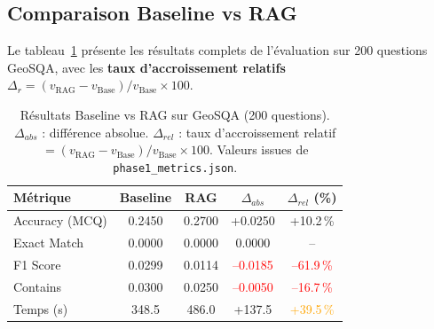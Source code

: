 \documentclass[12pt,a4paper]{article}
\begin{document}
\subsection{Comparaison Baseline vs RAG}
\label{sec:baseline_vs_rag}

Le tableau~\ref{tab:results_main} présente les résultats complets de l'évaluation
sur 200 questions GeoSQA, avec les \textbf{taux d'accroissement relatifs}
$\Delta_r = (v_{\text{RAG}} - v_{\text{Base}}) / v_{\text{Base}} \times 100$.

\begin{table}[H]
\centering
\caption{Résultats Baseline vs RAG sur GeoSQA (200 questions).
  $\Delta_{abs}$ : différence absolue.
  $\Delta_{rel}$ : taux d'accroissement relatif
  $= (v_{\text{RAG}} - v_{\text{Base}}) / v_{\text{Base}} \times 100$.
  Valeurs issues de \texttt{phase1\_metrics.json}.}
\label{tab:results_main}
\begin{tabular}{@{} l c c c c @{}}
\toprule
\textbf{Métrique} & \textbf{Baseline} & \textbf{RAG}
  & \textbf{$\Delta_{abs}$} & \textbf{$\Delta_{rel}$ (\%)} \\
\midrule
Accuracy (MCQ) & 0.2450 & 0.2700
  & \textcolor{green!60!black}{+0.0250}
  & \textcolor{green!60!black}{+10.2\,\%} \\
Exact Match    & 0.0000 & 0.0000
  & 0.0000 & -- \\
F1 Score       & 0.0299 & 0.0114
  & \textcolor{red}{--0.0185}
  & \textcolor{red}{--61.9\,\%} \\
Contains       & 0.0300 & 0.0250
  & \textcolor{red}{--0.0050}
  & \textcolor{red}{--16.7\,\%} \\
\midrule
Temps (s)      & 348.5  & 486.0
  & +137.5 & \textcolor{orange}{+39.5\,\%} \\
\bottomrule
\end{tabular}
\end{table}
\end{document}

